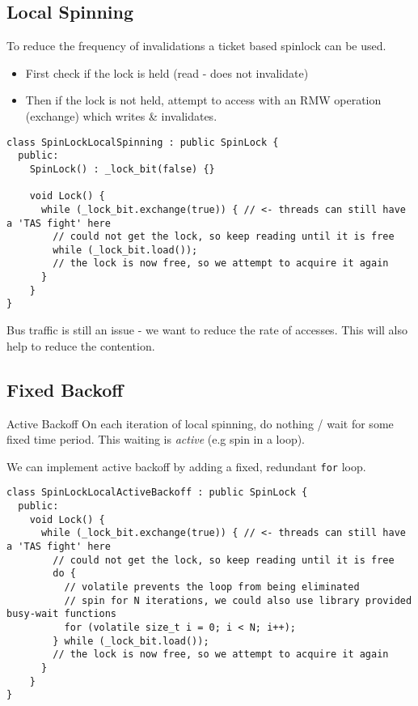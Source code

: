 \subsection{Local Spinning}
To reduce the frequency of invalidations a ticket based spinlock can be used.
\begin{itemize}
	\item First check if the lock is held (read - does not invalidate)
	\item Then if the lock is not held, attempt to access with an RMW operation (exchange) which writes \& invalidates.
\end{itemize}
\begin{verbatim}
class SpinLockLocalSpinning : public SpinLock {
  public:
    SpinLock() : _lock_bit(false) {}

    void Lock() {
      while (_lock_bit.exchange(true)) { // <- threads can still have a 'TAS fight' here
        // could not get the lock, so keep reading until it is free
        while (_lock_bit.load());
        // the lock is now free, so we attempt to acquire it again
      }
    }
}
\end{verbatim}
Bus traffic is still an issue - we want to reduce the rate of accesses. This will also help to reduce the contention.

\subsection{Fixed Backoff}
\begin{definitionbox}{Active Backoff}
	On each iteration of local spinning, do nothing / wait for some fixed time period. This waiting is \textit{active} (e.g spin in a loop).
\end{definitionbox}
We can implement active backoff by adding a fixed, redundant \texttt{for} loop.
\begin{verbatim}
class SpinLockLocalActiveBackoff : public SpinLock {
  public:
    void Lock() {
      while (_lock_bit.exchange(true)) { // <- threads can still have a 'TAS fight' here
        // could not get the lock, so keep reading until it is free
        do {
          // volatile prevents the loop from being eliminated
          // spin for N iterations, we could also use library provided busy-wait functions
          for (volatile size_t i = 0; i < N; i++);
        } while (_lock_bit.load());
        // the lock is now free, so we attempt to acquire it again
      }
    }
}
\end{verbatim}

